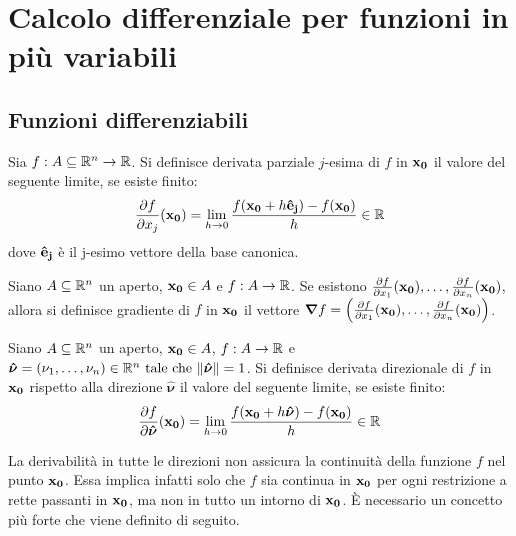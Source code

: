 \chapter{Calcolo differenziale per funzioni in più variabili}

\section{Funzioni differenziabili}

\begin{definition}
    Sia $f: A \subseteq \mathbb{R}^n \to \mathbb{R}$. Si definisce derivata parziale $j$-esima di $f$ in $\vb{x_0}$ il valore del seguente limite, se esiste finito:
    \begin{equation*}
        \frac{\partial f}{\partial x_j} (\vb{x_0}) = \displaystyle \lim_{h\to 0} \frac{f(\vb{x_0} + h\vb{\hat{e}_j}) - f(\vb{x_0})}{h} \in \mathbb{R}
    \end{equation*}
    dove $\vb{\hat{e}_j}$ è il j-esimo vettore della base canonica.
\end{definition}

\begin{definition}
    [Gradiente]
    Siano $A \subseteq \mathbb{R}^n$ un aperto, $\vb{x_0} \in A$ e $f:A \to \mathbb{R}$. Se esistono $\frac{\partial f}{\partial x_1}(\vb{x_0}),\dots,\\\frac{\partial f}{\partial x_n}(\vb{x_0})$, allora si definisce gradiente di $f$ in $\vb{x_0}$ il vettore $\bm{\nabla}f = \left( \frac{\partial f}{\partial x_1} (\vb{x_0}), \dots, \frac{\partial f}{\partial x_n}(\vb{x_0}) \right)$.
\end{definition}

\begin{definition}
    Siano $A \subseteq \mathbb{R}^n$ un aperto, $\vb{x_0} \in A$, $f:A \to \mathbb{R}$ e $\bm{\hat{\nu}} = (\nu_1,\dots,\nu_n) \in \mathbb{R}^n \text{ tale che } \norm{\bm{\hat{\nu}}}=1$. Si definisce derivata direzionale di $f$ in $\vb{x_0}$ rispetto alla direzione $\bm{\hat{\nu}}$ il valore del seguente limite, se esiste finito:
    \begin{equation*}
        \frac{\partial f}{\partial \bm{\hat{\nu}}} (\vb{x_0}) = \displaystyle \lim_{h\to 0} \frac{f(\vb{x_0} + h\bm{\hat{\nu}}) - f(\vb{x_0})}{h} \in \mathbb{R}
    \end{equation*}
\end{definition}

\begin{remark}
    La derivabilità in tutte le direzioni non assicura la continuità della funzione $f$ nel punto $\vb{x_0}$. Essa implica infatti solo che $f$ sia continua in $\vb{x_0}$ per ogni restrizione a rette passanti in $\vb{x_0}$, ma non in tutto un intorno di $\vb{x_0}$. È necessario un concetto più forte che viene definito di seguito.
\end{remark}


